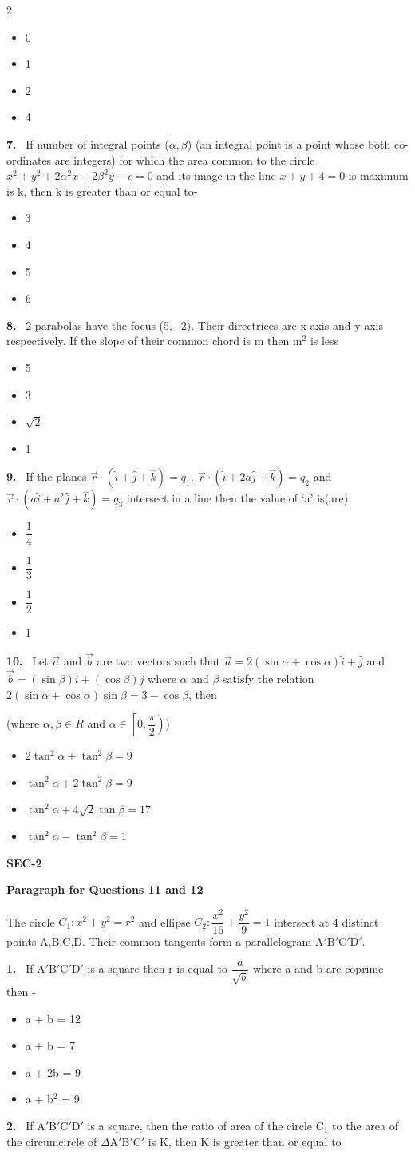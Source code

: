 \documentclass[10pt]{extarticle}
\newcommand{\sect}[1]{\par\smallskip\noindent\textbf{#1}\par}
\newcommand{\qn}[1]{\par\smallskip\noindent\textbf{#1.}~}
\newcommand{\paraq}[2]{\par\smallskip\noindent\textbf{Paragraph for Questions #1 and #2}\par}
\newenvironment{qoptions}{\begin{itemize}[leftmargin=1.8em,itemsep=1pt,topsep=2pt,label={}]}{\end{itemize}}
\newcommand{\opt}[2]{\item[(#1)] #2}
\begin{document}
\begin{multicols}{2}
\begin{qoptions}
\opt{A}{0}
\opt{B}{1}
\opt{C}{2}
\opt{D}{4}
\end{qoptions}
\qn{7} If number of integral points ($\alpha,\beta$) (an integral point is a point whose both co-ordinates are integers) for which the area common to the circle $x^2+y^2+2\alpha^2x+2\beta^2y+c=0$ and its image in the line $x+y+4=0$ is maximum is k, then k is greater than or equal to-
\begin{qoptions}
\opt{A}{3}
\opt{B}{4}
\opt{C}{5}
\opt{D}{6}
\end{qoptions}
\qn{8} 2 parabolas have the focus (5,$-$2). Their directrices are x-axis and y-axis respectively. If the slope of their common chord is m then m$^2$ is less
\begin{qoptions}
\opt{A}{5}
\opt{B}{3}
\opt{C}{$\sqrt{2}$}
\opt{D}{1}
\end{qoptions}
\qn{9} If the planes $\vec{r}\cdot(\hat{i}+\hat{j}+\hat{k})=q_1,\ \vec{r}\cdot(\hat{i}+2a\hat{j}+\hat{k})=q_2$ and $\vec{r}\cdot(a\hat{i}+a^2\hat{j}+\hat{k})=q_3$ intersect in a line then the value of `a' is(are)
\begin{qoptions}
\opt{A}{$\dfrac{1}{4}$}
\opt{B}{$\dfrac{1}{3}$}
\opt{C}{$\dfrac{1}{2}$}
\opt{D}{1}
\end{qoptions}
\qn{10} Let $\vec{a}$ and $\vec{b}$ are two vectors such that $\vec{a}=2(\sin\alpha+\cos\alpha)\hat{i}+\hat{j}$ and $\vec{b}=(\sin\beta)\hat{i}+(\cos\beta)\hat{j}$ where $\alpha$ and $\beta$ satisfy the relation $2(\sin\alpha+\cos\alpha)\sin\beta=3-\cos\beta$, then\par
(where $\alpha,\beta\in R$ and $\alpha\in\left[0,\dfrac{\pi}{2}\right)$)
\begin{qoptions}
\opt{A}{$2\tan^2\alpha+\tan^2\beta=9$}
\opt{B}{$\tan^2\alpha+2\tan^2\beta=9$}
\opt{C}{$\tan^2\alpha+4\sqrt{2}\tan\beta=17$}
\opt{D}{$\tan^2\alpha-\tan^2\beta=1$}
\end{qoptions}
\sect{SEC-2}
\paraq{11}{12}
The circle $C_1: x^2+y^2=r^2$ and ellipse $C_2: \dfrac{x^2}{16}+\dfrac{y^2}{9}=1$ intersect at 4 distinct points A,B,C,D. Their common tangents form a parallelogram A$'$B$'$C$'$D$'$.
\qn{1} If A$'$B$'$C$'$D$'$ is a square then r is equal to $\dfrac{a}{\sqrt{b}}$ where a and b are coprime then -
\begin{qoptions}
\opt{A}{a + b = 12}
\opt{B}{a + b = 7}
\opt{C}{a + 2b = 9}
\opt{D}{a + b$^2$ = 9}
\end{qoptions}
\qn{2} If A$'$B$'$C$'$D$'$ is a square, then the ratio of area of the circle C$_1$ to the area of the circumcircle of $\Delta$A$'$B$'$C$'$ is K, then K is greater than or equal to

\end{multicols}
\end{document}
